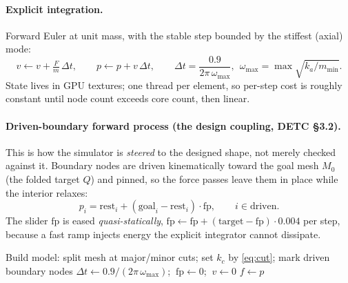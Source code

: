 \documentclass[11pt]{article}
\begin{document}
\paragraph{Explicit integration.} Forward Euler at unit mass, with the stable
step bounded by the stiffest (axial) mode:
\begin{equation}
v \leftarrow v+\tfrac{F}{m}\,\Delta t,\qquad p \leftarrow p+v\,\Delta t,\qquad
\Delta t=\frac{0.9}{2\pi\,\omega_{\max}},\ \ \omega_{\max}=\max\sqrt{k_a/m_{\min}}.
\label{eq:euler}
\end{equation}
State lives in GPU textures; one thread per element, so per-step cost is roughly
constant until node count exceeds core count, then linear.

\paragraph{Driven-boundary forward process (the design coupling, DETC \S3.2).}
This is how the simulator is \emph{steered} to the designed shape, not merely
checked against it. Boundary nodes are driven kinematically toward the goal mesh
$M_0$ (the folded target $Q$) and pinned, so the force passes leave them in place
while the interior relaxes:
\begin{equation}
p_i=\mathrm{rest}_i+(\mathrm{goal}_i-\mathrm{rest}_i)\cdot\mathrm{fp},
\qquad i\in\text{driven}.
\label{eq:drive}
\end{equation}
The slider $\mathrm{fp}$ is eased \emph{quasi-statically},
$\mathrm{fp}\leftarrow\mathrm{fp}+(\mathrm{target}-\mathrm{fp})\cdot0.004$ per
step, because a fast ramp injects energy the explicit integrator cannot
dissipate.

\begin{algorithm}[H]
\caption[\textsc{FoldSolver}]{\textsc{FoldSolver.solve}$(P,M_0,\mathrm{target},\mathrm{iters})$: AKDE explicit kirigami solver (\S\ref{sec:sim})}
\BlankLine
Build model: split mesh at major/minor cuts; set $k_c$ by \eqref{eq:cut}; mark driven boundary nodes\;
$\Delta t\leftarrow 0.9/(2\pi\,\omega_{\max})$; $\ \mathrm{fp}\leftarrow 0$; $\ v\leftarrow 0$\;
\KwRet $f\leftarrow p$\;
\end{algorithm}
\end{document}
